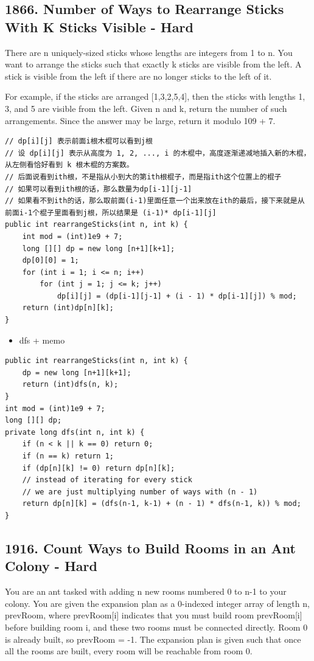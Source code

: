 \documentclass[9pt, b5paaper]{book}
\begin{document}
\subsection{1866. Number of Ways to Rearrange Sticks With K Sticks Visible - Hard}
\label{sec-1-5-2}
There are n uniquely-sized sticks whose lengths are integers from 1 to n. You want to arrange the sticks such that exactly k sticks are visible from the left. A stick is visible from the left if there are no longer sticks to the left of it.

For example, if the sticks are arranged [1,3,2,5,4], then the sticks with lengths 1, 3, and 5 are visible from the left.
Given n and k, return the number of such arrangements. Since the answer may be large, return it modulo 109 + 7.
\begin{verbatim}
// dp[i][j] 表示前面i根木棍可以看到j根
// 设 dp[i][j] 表示从高度为 1, 2, ..., i 的木棍中，高度逐渐递减地插入新的木棍，从左侧看恰好看到 k 根木棍的方案数。
// 后面说看到ith根，不是指从小到大的第ith根棍子，而是指ith这个位置上的棍子
// 如果可以看到ith根的话，那么数量为dp[i-1][j-1]
// 如果看不到ith的话，那么取前面(i-1)里面任意一个出来放在ith的最后，接下来就是从前面i-1个棍子里面看到j根，所以结果是 (i-1)* dp[i-1][j]
public int rearrangeSticks(int n, int k) {
    int mod = (int)1e9 + 7;
    long [][] dp = new long [n+1][k+1];
    dp[0][0] = 1;
    for (int i = 1; i <= n; i++) 
        for (int j = 1; j <= k; j++) 
            dp[i][j] = (dp[i-1][j-1] + (i - 1) * dp[i-1][j]) % mod;
    return (int)dp[n][k];
}
\end{verbatim}
\begin{itemize}
\item dfs + memo
\end{itemize}
\begin{verbatim}
public int rearrangeSticks(int n, int k) {
    dp = new long [n+1][k+1];
    return (int)dfs(n, k);
}
int mod = (int)1e9 + 7;
long [][] dp;
private long dfs(int n, int k) {
    if (n < k || k == 0) return 0;
    if (n == k) return 1;
    if (dp[n][k] != 0) return dp[n][k];
    // instead of iterating for every stick
    // we are just multiplying number of ways with (n - 1)
    return dp[n][k] = (dfs(n-1, k-1) + (n - 1) * dfs(n-1, k)) % mod;
}
\end{verbatim}

\subsection{1916. Count Ways to Build Rooms in an Ant Colony - Hard}
\label{sec-1-5-3}
You are an ant tasked with adding n new rooms numbered 0 to n-1 to your colony. You are given the expansion plan as a 0-indexed integer array of length n, prevRoom, where prevRoom[i] indicates that you must build room prevRoom[i] before building room i, and these two rooms must be connected directly. Room 0 is already built, so prevRoom\footnotemark[1]{} = -1. The expansion plan is given such that once all the rooms are built, every room will be reachable from room 0.
\end{document}
